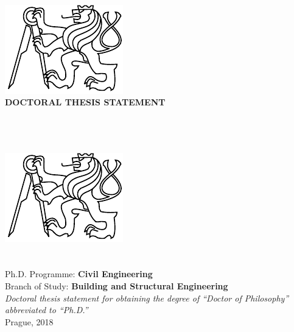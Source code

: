 \documentclass[
    11pt, %
    english, %
    singlespacing, %
    headsepline, %
    chapterinoneline, %
    ]{MastersDoctoralThesis} %
\begin{document}

\frontmatter %

\pagestyle{plain} %

%
%
\begin{titlepage}
\begin{center}

\vspace*{2cm}
{\textbf{\Large \textsc{\univname}}}\\[2cm]
\includegraphics[width=.5\textwidth]{figures/logo-cvut}\\[2cm]
{\Large {\textbf{DOCTORAL THESIS STATEMENT}}}
\vfill
\end{center}
\end{titlepage}

%
%
\begin{titlepage}
\begin{center}
{\Large\textsc{\univname}}\\[0.3cm]
{\large \facname}\\
\deptname\\[0.5cm]
\includegraphics[width=.2\textwidth]{figures/logo-cvut}\\[1cm]
{\Large\textsc{\authorname}}\\[1cm]
{\LARGE \bfseries \ttitle}\\[2cm]

\large
Ph.D. Programme: \textbf{Civil Engineering} \\
Branch of Study: \textbf{Building and Structural Engineering} \\[3cm]

\vfill
\large \textit{Doctoral thesis statement for obtaining the degree of ``Doctor of Philosophy'' abbreviated to ``Ph.D.''}\\[2cm]
{\large Prague, 2018}\\[2cm]
\end{center}
\end{titlepage}
\end{document}
